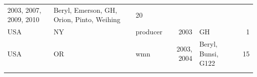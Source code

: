 \documentclass[fleqn,10pt,lineno]{wlpeerj} %
\theoremstyle{definition}
\theoremstyle{definition}
\theoremstyle{definition}
\theoremstyle{remark}
\begin{document}
\begin{longtable}[]{@{}lllrlr@{}}
\begin{minipage}[t]{0.19\columnwidth}
2003, 2007, 2009, 2010\strut
\end{minipage} & \begin{minipage}[t]{0.29\columnwidth}\raggedright\strut
Beryl, Emerson, GH, Orion, Pinto, Weihing\strut
\end{minipage} & \begin{minipage}[t]{0.04\columnwidth}\raggedleft\strut
20\strut
\end{minipage}\tabularnewline
\begin{minipage}[t]{0.11\columnwidth}\raggedright\strut
USA\strut
\end{minipage} & \begin{minipage}[t]{0.08\columnwidth}\raggedright\strut
NY\strut
\end{minipage} & \begin{minipage}[t]{0.12\columnwidth}\raggedright\strut
producer\strut
\end{minipage} & \begin{minipage}[t]{0.19\columnwidth}\raggedleft\strut
2003\strut
\end{minipage} & \begin{minipage}[t]{0.29\columnwidth}\raggedright\strut
GH\strut
\end{minipage} & \begin{minipage}[t]{0.04\columnwidth}\raggedleft\strut
1\strut
\end{minipage}\tabularnewline
\begin{minipage}[t]{0.11\columnwidth}\raggedright\strut
USA\strut
\end{minipage} & \begin{minipage}[t]{0.08\columnwidth}\raggedright\strut
OR\strut
\end{minipage} & \begin{minipage}[t]{0.12\columnwidth}\raggedright\strut
wmn\strut
\end{minipage} & \begin{minipage}[t]{0.19\columnwidth}\raggedleft\strut
2003, 2004\strut
\end{minipage} & \begin{minipage}[t]{0.29\columnwidth}\raggedright\strut
Beryl, Bunsi, G122\strut
\end{minipage} & \begin{minipage}[t]{0.04\columnwidth}\raggedleft\strut
15\strut
\end{minipage}\tabularnewline
\begin{minipage}[t]{0.11\columnwidth}\raggedright\strut
\strut
\end{minipage} & \begin{minipage}[t]{0.08\columnwidth}\raggedright\strut

\end{minipage}
\end{longtable}
\end{document}
